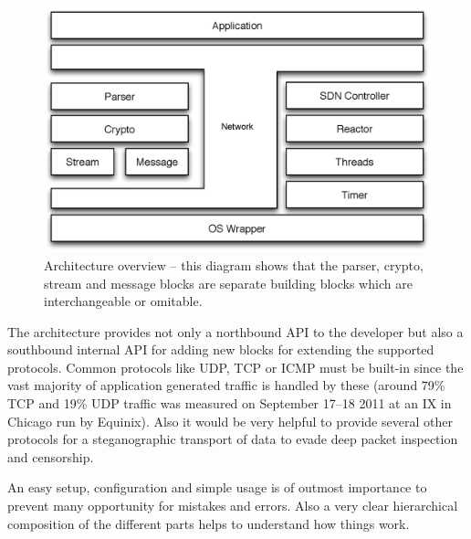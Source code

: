 \documentclass[twocolumn,english]{IEEEtran}
\theoremstyle{plain}
\theoremstyle{plain}
\begin{document}
\begin{figure}[h]
\includegraphics[width=\columnwidth]{Architecture_overview.eps}
\caption{Architecture overview -- this diagram shows that the parser, crypto,
stream and message blocks are separate building blocks which are
interchangeable or omitable.}
\label{fig:arch-overview}
\end{figure}

The architecture provides not only a northbound API to the developer but also
a southbound internal API for adding new blocks for extending the supported
protocols. Common protocols like UDP, TCP or ICMP must be built-in since the
vast majority of application generated traffic is handled by these (around 79\%
TCP and 19\% UDP traffic was measured on September 17--18 2011 at an IX in
Chicago run by Equinix\cite{caida:application-protocol-percentage}). Also it
would be very helpful to provide several other protocols for a steganographic
transport of data\cite{ijcsi:dns-steganography} to evade deep packet
inspection and censorship.

An easy setup, configuration and simple usage is of outmost importance to
prevent many opportunity for mistakes and errors. Also a very clear
hierarchical composition of the different parts helps to understand how things
work.
\end{document}
